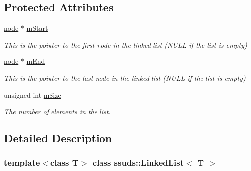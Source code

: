 \subsection*{Protected Attributes}
\begin{DoxyCompactItemize}
\item 
\mbox{\label{classssuds_1_1_linked_list_aba527942566fb6e51a44a7f9f87ba498}} 
\mbox{\hyperlink{classssuds_1_1_linked_list_1_1node}{node}} $\ast$ \mbox{\hyperlink{classssuds_1_1_linked_list_aba527942566fb6e51a44a7f9f87ba498}{m\+Start}}
\begin{DoxyCompactList}\small\item\em This is the pointer to the first node in the linked list (N\+U\+LL if the list is empty) \end{DoxyCompactList}\item 
\mbox{\label{classssuds_1_1_linked_list_a15aa95a40bf006d5f3c637fa0aed6d01}} 
\mbox{\hyperlink{classssuds_1_1_linked_list_1_1node}{node}} $\ast$ \mbox{\hyperlink{classssuds_1_1_linked_list_a15aa95a40bf006d5f3c637fa0aed6d01}{m\+End}}
\begin{DoxyCompactList}\small\item\em This is the pointer to the last node in the linked list (N\+U\+LL if the list is empty) \end{DoxyCompactList}\item 
\mbox{\label{classssuds_1_1_linked_list_aaafa0f724155d932f915cb9c816ef2a0}} 
unsigned int \mbox{\hyperlink{classssuds_1_1_linked_list_aaafa0f724155d932f915cb9c816ef2a0}{m\+Size}}
\begin{DoxyCompactList}\small\item\em The number of elements in the list. \end{DoxyCompactList}\end{DoxyCompactItemize}


\subsection{Detailed Description}
\subsubsection*{template$<$class T$>$\newline
class ssuds\+::\+Linked\+List$<$ T $>$}

